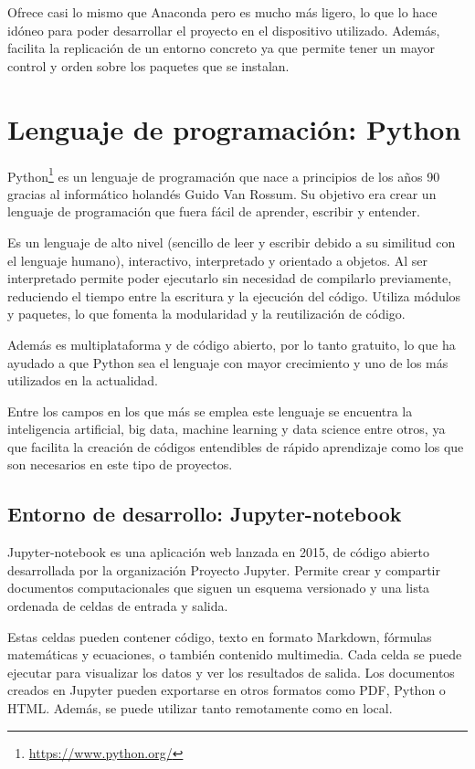 \documentclass[a4paper, 12pt]{book}
\begin{document}
Ofrece casi lo mismo que Anaconda pero es mucho más ligero, lo que lo hace idóneo para poder desarrollar el proyecto en el dispositivo utilizado. Además, facilita la replicación de un entorno concreto ya que permite tener un mayor control y orden sobre los paquetes que se instalan. 

\section{Lenguaje de programación: Python}
\label{sec:lenguaje_de_programación}

Python\footnote{\url{https://www.python.org/}} es un lenguaje de programación que nace a principios de los años 90 gracias al informático holandés Guido Van Rossum. Su objetivo era crear un lenguaje de programación que fuera fácil de aprender, escribir y entender.

Es un lenguaje de alto nivel (sencillo de leer y escribir debido a su similitud con el lenguaje humano), interactivo, interpretado y orientado a objetos. Al ser interpretado permite poder ejecutarlo sin necesidad de compilarlo previamente, reduciendo el tiempo entre la escritura y la ejecución del código. Utiliza módulos y paquetes, lo que fomenta la modularidad y la reutilización de código. 

Además es multiplataforma y de código abierto, por lo tanto gratuito, lo que ha ayudado a que Python sea el lenguaje con mayor crecimiento y uno de los más utilizados en la actualidad.  

Entre los campos en los que más se emplea este lenguaje se encuentra la inteligencia artificial, big data, machine learning y data science entre otros, ya que facilita la creación de códigos entendibles de rápido aprendizaje como los que son necesarios en este tipo de proyectos.

\subsection{Entorno de desarrollo: Jupyter-notebook}
\label{subsec:entorno_de_desarrollo}

Jupyter-notebook es una aplicación web lanzada en 2015, de código abierto desarrollada por la organización Proyecto Jupyter. Permite crear y compartir documentos computacionales que siguen un esquema versionado y una lista ordenada de celdas de entrada y salida.

Estas celdas pueden contener código, texto en formato Markdown, fórmulas matemáticas y ecuaciones, o también contenido multimedia. Cada celda se puede ejecutar para visualizar los datos y ver los resultados de salida. Los documentos creados en Jupyter pueden exportarse en otros formatos como PDF, Python o HTML. Además, se puede utilizar tanto remotamente como en local.
\end{document}
